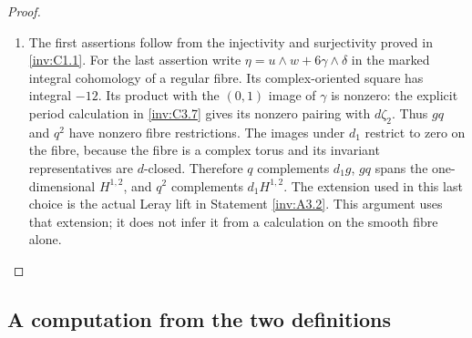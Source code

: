\begin{proof}
\begin{enumerate}[label=\arabic*.,leftmargin=*]
\item The first assertions follow from the injectivity and surjectivity
proved in \ref{inv:C1.1}.  For the last assertion write
$\eta=u\wedge w+6\gamma\wedge\delta$ in the marked integral
cohomology of a regular fibre.  Its complex-oriented square has
integral $-12$.  Its product with the $(0,1)$ image of $\gamma$ is
nonzero: the explicit period calculation in \ref{inv:C3.7} gives its nonzero
pairing with $d\zeta_2$.  Thus $gq$ and $q^2$ have nonzero fibre
restrictions.  The images under $d_1$ restrict to zero on the fibre,
because the fibre is a complex torus and its invariant representatives
are $d$-closed.  Therefore $q$ complements $d_1g$, $gq$ spans the
one-dimensional $H^{1,2}$, and $q^2$ complements $d_1H^{1,2}$.
The extension used in this last choice is the actual Leray lift in
Statement \ref{inv:A3.2}.  This argument uses that extension; it does not infer
it from a calculation on the smooth fibre alone.
\end{enumerate}
\end{proof}

\subsection{A computation from the two definitions}

